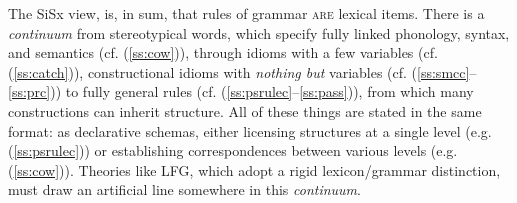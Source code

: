 \documentclass[output=paper,hidelinks]{langscibook}
\begin{document}
 
The SiSx view, is, in sum, that rules of grammar \textsc{are} lexical items. There is a \textit{continuum} from stereotypical words, which specify fully linked phonology, syntax, and semantics (cf. (\ref{ss:cow})), through idioms with a few variables (cf. (\ref{ss:catch})), constructional idioms with \textit{nothing but} variables (cf. (\ref{ss:smcc}--\ref{ss:prc})) to fully general rules (cf. (\ref{ss:psrulec}--\ref{ss:pass})), from which many constructions can inherit structure. All of these things are stated in the same format: as declarative schemas, either licensing structures at a single level (e.g. (\ref{ss:psrulec})) or establishing correspondences between various levels (e.g. (\ref{ss:cow})). Theories like LFG, which adopt a rigid lexicon/grammar distinction, must draw an artificial line somewhere in this \textit{continuum}.






\end{document}
